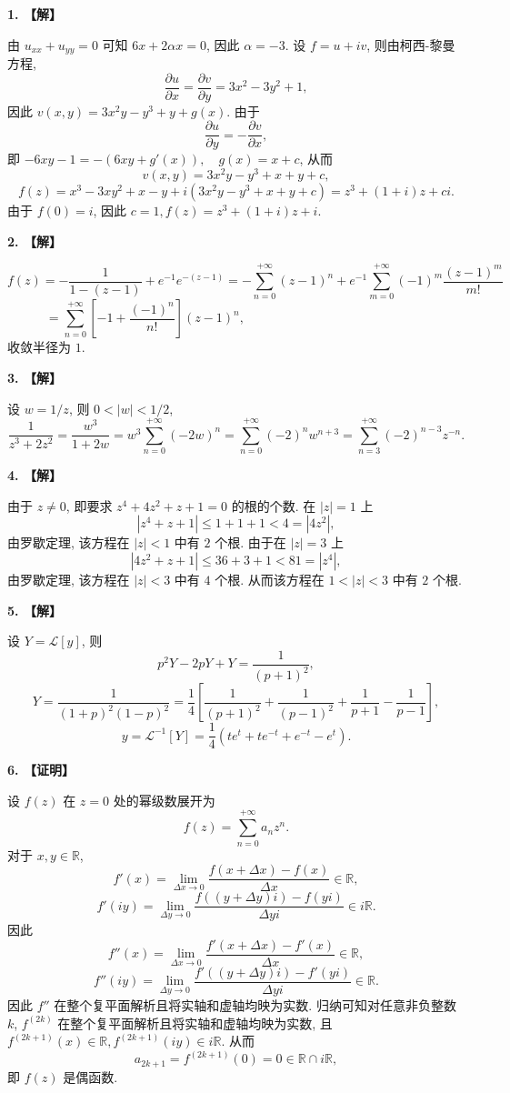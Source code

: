 \documentclass[simple]{hfutexam}
\newcommand\msl{\mathscr{L}}
\begin{document}

\textbf{1. 【解】}

由 $u_{xx}+u_{yy}=0$ 可知 $6x+2\alpha x=0$, 因此 $\alpha=-3$.
设 $f=u+iv$, 则由柯西-黎曼方程,
  \[\frac{\partial u}{\partial x}=\frac{\partial v}{\partial y}=3x^2-3y^2+1,\]
因此 $v(x,y)=3x^2y-y^3+y+g(x)$.
由于
  \[\frac{\partial u}{\partial y}=-\frac{\partial v}{\partial x},\]
即 $-6xy-1=-(6xy+g'(x)),\quad g(x)=x+c$, 从而
  \[v(x,y)=3x^2y-y^3+x+y+c,\]
  \[f(z)=x^3-3xy^2+x-y+i(3x^2y-y^3+x+y+c)
  =z^3+(1+i)z+ci.\]
由于 $f(0)=i$, 因此 $c=1,f(z)=z^3+(1+i)z+i$.

\textbf{2. 【解】}

\[f(z)=-\frac{1}{1-(z-1)}+e^{-1}e^{-(z-1)}
=-\sum_{n=0}^{+\infty} (z-1)^n+e^{-1}\sum_{m=0}^{+\infty} (-1)^m\frac{(z-1)^m}{m!}\]
\[=\sum_{n=0}^{+\infty} \left[-1+\frac{(-1)^n}{n!}\right](z-1)^n,\hspace{6cm}\]
收敛半径为 $1$.

\textbf{3. 【解】}

设 $w=1/z$, 则 $0<|w|<1/2$,
\[\frac{1}{z^3+2z^2}=\frac{w^3}{1+2w}=w^3\sum_{n=0}^{+\infty}(-2w)^n=\sum_{n=0}^{+\infty}(-2)^nw^{n+3}=\sum_{n=3}^{+\infty}(-2)^{n-3}z^{-n}.\]

\textbf{4. 【解】}

由于 $z\neq 0$, 即要求 $z^4+4z^2+z+1=0$ 的根的个数.
在 $|z|=1$ 上
\[|z^4+z+1|\le 1+1+1<4=|4z^2|,\]
由罗歇定理, 该方程在 $|z|<1$ 中有 $2$ 个根. 由于在 $|z|=3$ 上
\[|4z^2+z+1|\le 36+3+1<81=|z^4|,\]
由罗歇定理, 该方程在 $|z|<3$ 中有 $4$ 个根.
从而该方程在 $1<|z|<3$ 中有 $2$ 个根.

\textbf{5. 【解】}

设 $Y=\msl[y]$, 则
\[p^2Y-2pY+Y=\frac{1}{(p+1)^2},\]
\[Y=\frac{1}{(1+p)^2(1-p)^2}=\frac{1}{4}\left[\frac{1}{(p+1)^2}+\frac{1}{(p-1)^2}+\frac{1}{p+1}-\frac{1}{p-1}\right],\]
\[y=\msl^{-1}[Y]=\frac{1}{4}(te^t+te^{-t}+e^{-t}-e^t).\]

\textbf{6. 【证明】}

设 $f(z)$ 在 $z=0$ 处的幂级数展开为
  \[f(z)=\sum_{n=0}^{+\infty}a_n z^n.\]
对于 $x,y\in\mathbb{R}$,
  \[f'(x)=\lim_{\Delta x\rightarrow 0}\frac{f(x+\Delta x)-f(x)}{\Delta x}\in \mathbb{R},\]
  \[f'(iy)=\lim_{\Delta y\rightarrow 0}\frac{f((y+\Delta y) i)-f(yi)}{\Delta y i}\in i\mathbb{R}.\]
因此
  \[f''(x)=\lim_{\Delta x\rightarrow 0}\frac{f'(x+\Delta x)-f'(x)}{\Delta x}\in \mathbb{R},\]
  \[f''(iy)=\lim_{\Delta y\rightarrow 0}\frac{f'((y+\Delta y) i)-f'(yi)}{\Delta y i}\in \mathbb{R}.\]
因此 $f''$ 在整个复平面解析且将实轴和虚轴均映为实数. 归纳可知对任意非负整数 $k$,  $f^{(2k)}$ 在整个复平面解析且将实轴和虚轴均映为实数, 且 $f^{(2k+1)}(x)\in \mathbb{R},f^{(2k+1)}(iy)\in i\mathbb{R}$. 从而
  \[a_{2k+1}=f^{(2k+1)}(0)=0\in\mathbb{R}\cap i\mathbb{R},\]
即 $f(z)$ 是偶函数.
\end{document}

